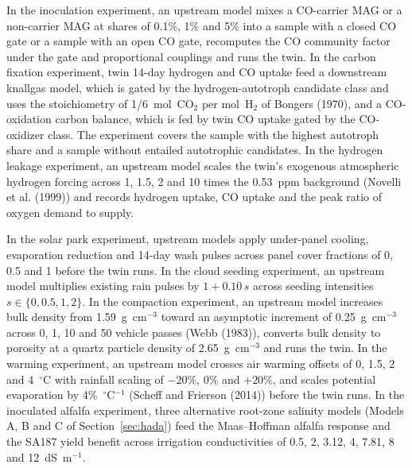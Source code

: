 \documentclass[11pt,a4paper]{article}
\begin{document}
In the inoculation experiment, an upstream model mixes a CO-carrier MAG or a non-carrier MAG at shares of 0.1\%, 1\% and 5\% into a sample with a closed CO gate or a sample with an open CO gate, recomputes the CO community factor under the gate and proportional couplings and runs the twin. In the carbon fixation experiment, twin 14-day hydrogen and CO uptake feed a downstream knallgas model, which is gated by the hydrogen-autotroph candidate class and uses the stoichiometry of 1/6~mol~CO$_2$ per mol~H$_2$ of Bongers (1970), and a CO-oxidation carbon balance, which is fed by twin CO uptake gated by the CO-oxidizer class. The experiment covers the sample with the highest autotroph share and a sample without entailed autotrophic candidates. In the hydrogen leakage experiment, an upstream model scales the twin's exogenous atmospheric hydrogen forcing across 1, 1.5, 2 and 10 times the 0.53~ppm background (Novelli et al. (1999)) and records hydrogen uptake, CO uptake and the peak ratio of oxygen demand to supply.

In the solar park experiment, upstream models apply under-panel cooling, evaporation reduction and 14-day wash pulses across panel cover fractions of 0, 0.5 and 1 before the twin runs. In the cloud seeding experiment, an upstream model multiplies existing rain pulses by $1+0.10\,s$ across seeding intensities $s\in\{0,0.5,1,2\}$. In the compaction experiment, an upstream model increases bulk density from 1.59~g~cm$^{-3}$ toward an asymptotic increment of 0.25~g~cm$^{-3}$ across 0, 1, 10 and 50 vehicle passes (Webb (1983)), converts bulk density to porosity at a quartz particle density of 2.65~g~cm$^{-3}$ and runs the twin. In the warming experiment, an upstream model crosses air warming offsets of 0, 1.5, 2 and 4~$^\circ$C with rainfall scaling of $-20\%$, 0\% and $+20\%$, and scales potential evaporation by 4\%~$^\circ$C$^{-1}$ (Scheff and Frierson (2014)) before the twin runs. In the inoculated alfalfa experiment, three alternative root-zone salinity models (Models A, B and C of Section~\ref{sec:hada}) feed the Maas--Hoffman alfalfa response and the SA187 yield benefit across irrigation conductivities of 0.5, 2, 3.12, 4, 7.81, 8 and 12~dS~m$^{-1}$.
\end{document}
